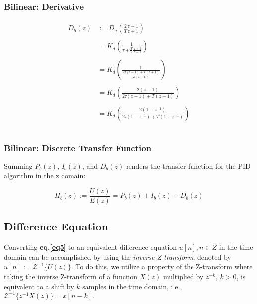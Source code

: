 \documentclass[11pt]{article}
\theoremstyle{definition}
\begin{document}
\subsubsection{Bilinear: Derivative}

\begin{align*}
\begin{split}
    D_{b}(z) &:= D_{a}\left(\frac{2}{T}\frac{z-1}{z+1}\right) \\\\
             &= K_{d}\left(\frac{1}{\tau + \frac{T}{2}\frac{z+1}{z-1}}\right) \\\\
             &= K_{d}\left(\frac{1}{\frac{2\tau (z-1) + T(z + 1)}{2(z-1)}}\right) \\\\
             &= K_{d}\left(\frac{2(z-1)}{2\tau (z-1) + T(z+1)}\right) \\\\
             &= K_{d}\left(\frac{2(1-z^{-1})}{2\tau (1-z^{-1}) + T(1+z^{-1})}\right) \\\\
\end{split}
\end{align*}

\subsubsection{Bilinear: Discrete Transfer Function}

Summing $P_{b}(z)$, $I_{b}(z)$, and $D_{b}(z)$ renders the transfer function for the PID algorithm in the z domain:

\begin{equation} \label{eq5}
\boxed{
    H_{b}(z) := \frac{U(z)}{E(z)} = P_{b}(z) + I_{b}(z) + D_{b}(z)
}
\end{equation}

\subsection{Difference Equation}

Converting \textbf{eq.\ref{eq5}} to an equivalent difference equation $u[n], n \in Z$ in the time domain can be accomplished by using the \textit{inverse
Z-transform}, denoted by $u[n] := \mathcal{Z}^{-1}\{U(z)\}$. To do this, we utilize a property of the Z-transform where taking the inverse
Z-transform of a function $X(z)$ multiplied by $z^{-k}$, $k > 0$, is equivalent to a shift by $k$ samples in the time domain, i.e.,
$\mathcal{Z}^{-1}\{z^{-1}X(z)\} = x[n-k].$
\end{document}
